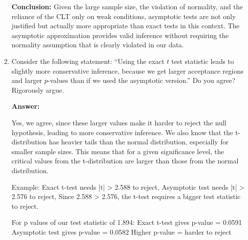 \documentclass[12pt,a4paper]{article}
\begin{document}
\begin{enumerate}[label=(\alph*)]
\begin{enumerate}
\end{enumerate}

\textbf{Conclusion:} Given the large sample size, the violation 
of normality, and the reliance of the CLT only on weak conditions, 
asymptotic tests are not only justified but actually more 
appropriate than exact tests in this context. The asymptotic 
approximation provides valid inference without requiring the 
normality assumption that is clearly violated in our data.
  
  \item Consider the following statement: ``Using the exact $t$ test statistic leads to slightly more conservative inference, because we get larger acceptance regions and larger $p$-values than if we used the asymptotic version.'' Do you agree? Rigorously argue.
  
  \textbf{Answer:} 

  Yes, we agree, since these larger values make it harder to reject the null hypothesis, leading to more conservative inference. 
  We also know that the t-distribution has heavier tails than the normal distribution, especially for smaller sample sizes. This means that for a given significance level, the critical values from the t-distribution are larger than those from the normal distribution.
  
  Example: Exact t-test needs |t| > 2.588 to reject, Asymptotic test needs |t| > 2.576 to reject, Since 2.588 > 2.576, the t-test requires a bigger test statistic to reject.

  For p values of our test statistic of 1.894:
  Exact t-test gives p-value = 0.0591
  Asymptotic test gives p-value = 0.0582
  Higher p-value = harder to reject

\end{enumerate}
\end{document}
